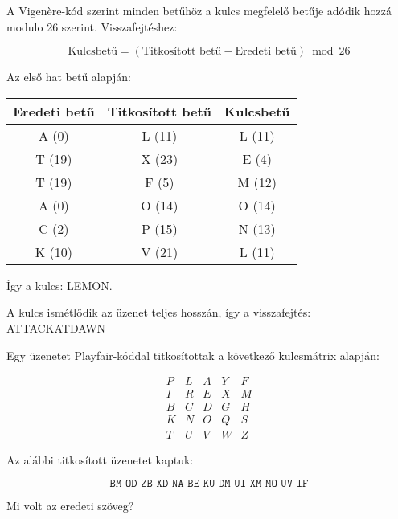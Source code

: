 \begin{solution}
A Vigenère-kód szerint minden betűhöz a kulcs megfelelő betűje adódik
hozzá modulo 26 szerint. Visszafejtéshez:

\[
\text{Kulcsbetű}=(\text{Titkosított betű}-\text{Eredeti betű})\bmod26
\]

Az első hat betű alapján:
\begin{center}
\begin{tabular}{|c|c|c|}
\hline 
Eredeti betű & Titkosított betű & Kulcsbetű\tabularnewline
\hline 
A (0) & L (11) & L (11)\tabularnewline
T (19) & X (23) & E (4)\tabularnewline
T (19) & F (5) & M (12)\tabularnewline
A (0) & O (14) & O (14)\tabularnewline
C (2) & P (15) & N (13)\tabularnewline
K (10) & V (21) & L (11)\tabularnewline
\hline 
\end{tabular}
\par\end{center}
Így a kulcs: LEMON.

A kulcs ismétlődik az üzenet teljes hosszán, így a visszafejtés:\\
ATTACKATDAWN 
\end{solution}
\begin{extraproblem}
Egy üzenetet Playfair-kóddal titkosítottak a következő kulcsmátrix
alapján:

\[
\begin{array}{ccccc}
P & L & A & Y & F\\
I & R & E & X & M\\
B & C & D & G & H\\
K & N & O & Q & S\\
T & U & V & W & Z
\end{array}
\]

Az alábbi titkosított üzenetet kaptuk:

\[
\texttt{BM\ OD\ ZB\ XD\ NA\ BE\ KU\ DM\ UI\ XM\ MO\ UV\ IF}
\]

Mi volt az eredeti szöveg? 
\end{extraproblem}

